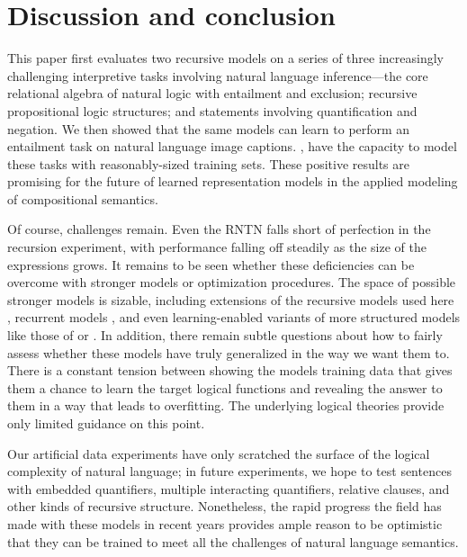 \section{Discussion and conclusion}\label{sec:discussion}

This paper first evaluates two recursive models on a series of three increasingly
challenging interpretive tasks involving natural language inference---the 
core relational algebra of natural logic with entailment and
exclusion; recursive propositional logic structures; and statements
involving quantification and negation. We then showed that the same models can learn to
perform an entailment task on natural language image captions. , have the capacity to model these tasks with 
reasonably-sized training sets. These positive results are
promising for the future of learned representation models in the
applied modeling of compositional semantics.

Of course, challenges remain. Even
the RNTN falls short of perfection in the recursion experiment, with
performance falling off steadily as the size of the expressions grows. It
remains to be seen whether these deficiencies can be overcome with
stronger models or optimization procedures. The space of possible stronger
models is sizable, including extensions of the recursive models used here
\cite{sochergrounded,kalchbrenner2014convolutional,irsoydeep}, recurrent
models \cite{sutskever2014sequence}, and even learning-enabled variants 
of more structured models like those of  or .
In addition,
there remain subtle questions about how to fairly assess whether these
models have truly generalized in the way we want them to. There is a
constant tension between showing the models training data that gives
them a chance to learn the target logical functions and revealing the
answer to them in a way that leads to overfitting. The underlying
logical theories provide only limited guidance on this point.

Our artificial data experiments have only scratched the surface 
of the logical complexity of natural language; in future experiments, we hope to test sentences
with embedded quantifiers, multiple interacting quantifiers, relative
clauses, and other kinds of recursive structure. Nonetheless, the
rapid progress the field has made with these models in recent years
provides ample reason to be optimistic that they can be trained to
meet all the challenges of natural language semantics.

